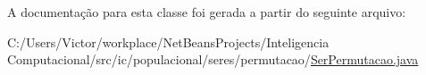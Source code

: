 A documentação para esta classe foi gerada a partir do seguinte arquivo\-:\begin{DoxyCompactItemize}
\item 
C\-:/\-Users/\-Victor/workplace/\-Net\-Beans\-Projects/\-Inteligencia Computacional/src/ic/populacional/seres/permutacao/\hyperlink{_ser_permutacao_8java}{Ser\-Permutacao.\-java}\end{DoxyCompactItemize}
